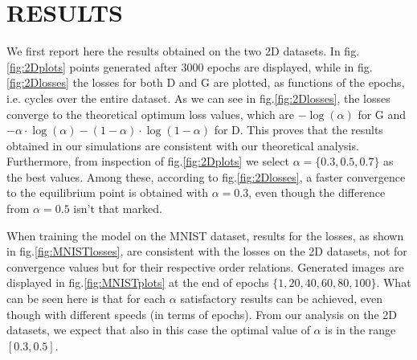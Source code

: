 \section{RESULTS} \label{results}

We first report here the results obtained on the two 2D datasets. In fig.\ref{fig:2Dplots} points generated after 3000 epochs are displayed, while in fig.\ref{fig:2Dlosses} the losses for both D and G are plotted, as functions of the epochs, i.e. cycles over the entire dataset.
As we can see in fig.\ref{fig:2Dlosses}, the losses converge to the theoretical optimum loss values, which are $-\log(\alpha)$ for G and $-\alpha\cdot\log(\alpha) - (1-\alpha)\cdot\log(1-\alpha)$ for D.
This proves that the results obtained in our simulations are consistent with our theoretical analysis. Furthermore, from inspection of fig.\ref{fig:2Dplots} we select $\alpha=\{0.3,0.5,0.7\}$ as the best values. Among these, according to fig.\ref{fig:2Dlosses}, a faster convergence to the equilibrium point is obtained with $\alpha=0.3$, even though the difference from $\alpha=0.5$ isn't that marked.

When training the model on the MNIST dataset, results for the losses, as shown in fig.\ref{fig:MNISTlosses}, are consistent with the losses on the 2D datasets, not for convergence values but for their respective order relations. Generated images are displayed in fig.\ref{fig:MNISTplots} at the end of epochs $\{1,20,40,60,80,100\}$. What can be seen here is that for each $\alpha$ satisfactory results can be achieved, even though with different speeds (in terms of epochs). From our analysis on the 2D datasets, we expect that also in this case the optimal value of $\alpha$ is in the range $[0.3,0.5]$.

